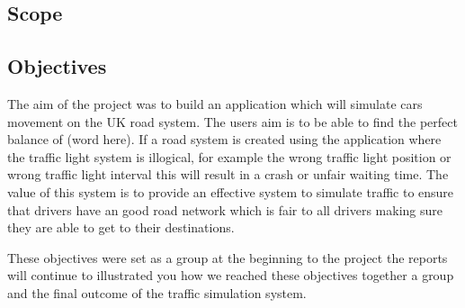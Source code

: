 \documentclass[11pt]{article}
\begin{document}
	\subsection{Scope}%
	
	\subsection{Objectives} %
	The aim of the project was to build an application which will simulate cars movement on the UK road system. The users aim is to be able to find the perfect balance of (word here). If a road system is created using the application where the traffic light system is illogical, for example the wrong traffic light position or wrong traffic light interval this will result in a crash or unfair waiting time.
	The value of this system is to provide an effective system to simulate traffic to ensure that drivers have an good road network which is fair to all drivers making sure they are able to get to their destinations. 
	
	These objectives were set as a group at the beginning to the project the reports will continue to illustrated you how we reached these objectives together a group and the final outcome of the traffic simulation system.
	
\end{document}
